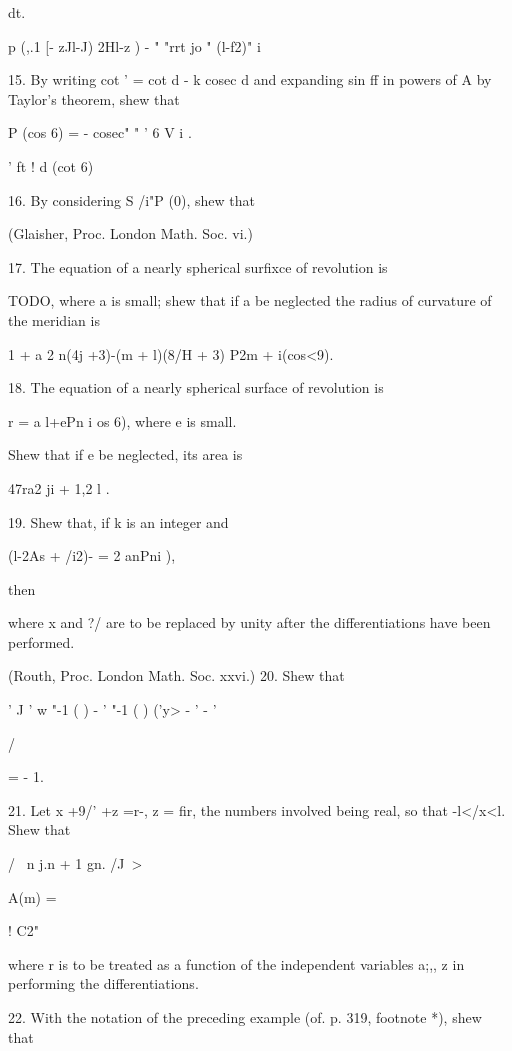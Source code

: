 {{{{dt. 

p (,.1 [- zJl-J) 2Hl-z ) - " "rrt jo " (l-f2)" i

15. By writing cot ' = cot d - k cosec d and expanding sin ff in
powers of A by Taylor's theorem, shew that

P (cos 6) = - cosec" " ' 6 V i . 

' ft ! d (cot 6)

%
%

16. By considering S /i"P (0), shew that

(Glaisher, Proc. London Math. Soc. vi.)

17. The equation of a nearly spherical surfixce of revolution is

TODO, where a is
small; shew that if a be neglected the radius of curvature of the
meridian is

1 + a 2 n(4j +3)-(m + l)(8/H + 3) P2m + i(cos<9).


18. The equation of a nearly spherical surface of revolution is

r = a l+ePn i os 6), where e is small.

Shew that if e be neglected, its area is

47ra2 ji + 1,2 l . 

19. Shew that, if k is an integer and

(l-2As + /i2)- = 2 anPni ),

then

where x and ?/ are to be replaced by unity after the differentiations
have been performed.

(Routh, Proc. London Math. Soc. xxvi.) 20. Shew that

' J ' w "-1 ( ) - ' "-1 ( ) ('y> - ' - '

/

= - 1. 

21. Let x +9/' +z =r-, z = fir, the numbers involved being real, so
that -l</x<l. Shew that

/ \ n j.n + 1 gn. /J~>

A(m) =

  ! C2"

where r is to be treated as a function of the independent variables
a;,, z in performing the differentiations.

22. With the notation of the preceding example (of. p. 319, footnote
*), shew that

}}}}
